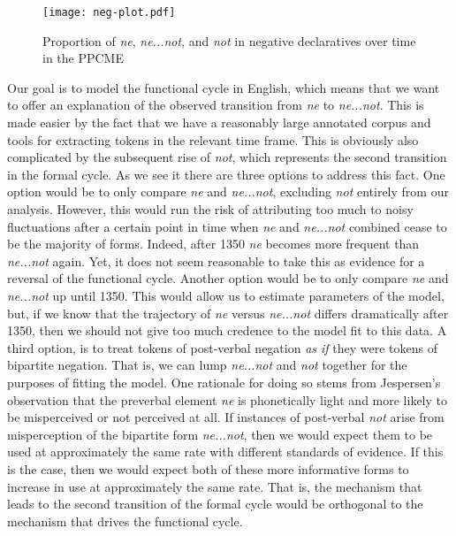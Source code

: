 \documentclass[linguex]{sp}
\theoremstyle{definition} \newtheorem{definition}{Definition}
\begin{document}
\begin{figure}
\centering
     \texttt{[image: neg-plot.pdf]}
\caption{Proportion of \textit{\color{red} ne}, \textit{\color{blue} ne...not}, and \textit{\color{green} not}  in negative declaratives over time in the PPCME}
\label{neg-three-plot}
\end{figure}


Our goal is to model the functional cycle in English, which means that we want to offer an explanation of the observed transition from \textit{\color{red} ne} to \textit{\color{blue} ne...not}. This is made easier by the fact that we have a reasonably large annotated corpus and tools for extracting tokens in the relevant time frame. This is obviously also complicated by the subsequent rise of \textit{\color{green} not}, which represents the second transition in the formal cycle.  As we see it there are three options to address this fact. One option would be to only compare \textit{\color{red} ne} and \textit{\color{blue} ne...not}, excluding \textit{\color{green} not} entirely from our analysis. However, this would run the risk of attributing too much to noisy fluctuations after a certain point in time when \textit{\color{red} ne} and \textit{\color{blue} ne...not} combined cease to be the majority of forms. Indeed, after 1350 \textit{\color{red} ne} becomes more frequent than \textit{\color{blue} ne...not} again. Yet, it does not seem reasonable to take this as evidence for a reversal of the functional cycle.   Another option would be to only compare \textit{\color{red} ne} and \textit{\color{blue} ne...not} up until 1350. This would allow us to estimate parameters of the model, but, if we know that the trajectory of \textit{\color{red} ne} versus \textit{\color{blue} ne...not} differs dramatically after 1350, then we should not give too much credence to the model fit to this data. A third option, is to treat tokens of post-verbal negation \emph{as if} they were tokens of bipartite negation. That is, we can lump \textit{\color{blue} ne...not} and \textit{\color{green} not} together for the purposes of fitting the model. One rationale for doing so stems from Jespersen's \citeyearpar{jespersen:1917} observation that the preverbal element \emph{ne} is phonetically light and more likely to be misperceived or not perceived at all. If instances of post-verbal \textit{\color{green} not}  arise from misperception of the bipartite form \textit{\color{blue} ne...not}, then we would expect them to be used at approximately the same rate with different standards of evidence.  If this is the case, then we would expect both of these more informative forms to increase in use at approximately the same rate.  That is, the mechanism that leads to the second transition of the formal cycle would be orthogonal to the mechanism that drives the functional cycle. 
\end{document}
